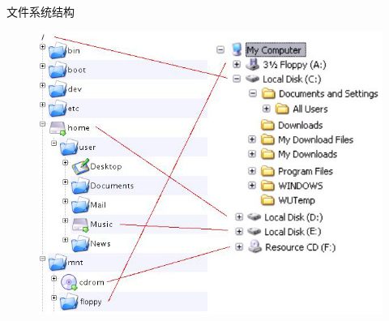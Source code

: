 
\begin{frame}{文件系统结构}
    \begin{figure}
        \centering
        \includegraphics[width=0.55\linewidth]{Images/FileSystemWindowsVsLinux.png}
    \end{figure}
\end{frame}




